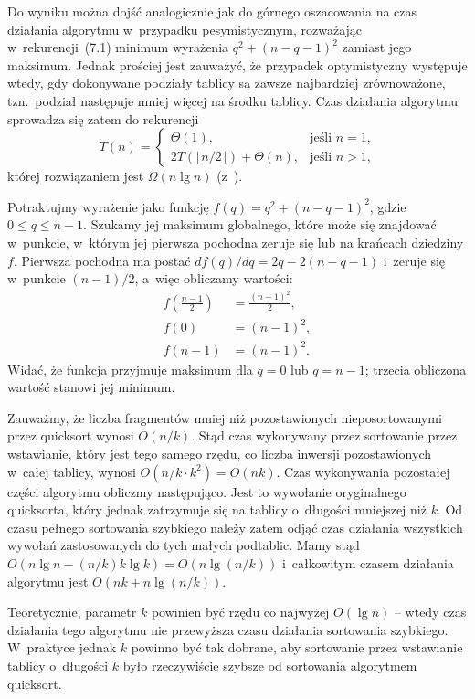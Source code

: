 Do wyniku można dojść analogicznie jak do górnego oszacowania na czas działania algorytmu w~przypadku pesymistycznym, rozważając w~rekurencji~(7.1) minimum wyrażenia $q^2+(n-q-1)^2$ zamiast jego maksimum. Jednak prościej jest zauważyć, że przypadek optymistyczny występuje wtedy, gdy dokonywane podziały tablicy są zawsze najbardziej zrównoważone, tzn.\ podział następuje mniej więcej na środku tablicy. Czas działania algorytmu sprowadza się zatem do rekurencji
\[
	T(n) = \begin{cases}
		\Theta(1), & \text{jeśli $n=1$,} \\
		2T(\lfloor n/2\rfloor)+\Theta(n), & \text{jeśli $n>1$,}
	\end{cases}
\]
której rozwiązaniem jest $\Omega(n\lg n)$ (z~).

\exercise %
Potraktujmy wyrażenie jako funkcję $f(q)=q^2+(n-q-1)^2$, gdzie $0\le q\le n-1$. Szukamy jej maksimum globalnego, które może się znajdować w~punkcie, w~którym jej pierwsza pochodna zeruje się lub na krańcach dziedziny $f$. Pierwsza pochodna ma postać $df(q)/dq=2q-2(n-q-1)$ i~zeruje się w~punkcie $(n-1)/2$, a~więc obliczamy wartości:
\begin{align*}
	f\left(\frac{n-1}{2}\right) &= \frac{(n-1)^2}{2}, \\
	f(0) &= (n-1)^2, \\
	f(n-1) &= (n-1)^2.
\end{align*}
Widać, że funkcja przyjmuje maksimum dla $q=0$ lub $q=n-1$; trzecia obliczona wartość stanowi jej minimum.

\exercise %
\exercise %
Zauważmy, że liczba fragmentów mniej niż  pozostawionych nieposortowanymi przez quicksort wynosi $O(n/k)$. Stąd czas wykonywany przez sortowanie przez wstawianie, który jest tego samego rzędu, co liczba inwersji pozostawionych w~całej tablicy, wynosi $O(n/k\cdot k^2)=O(nk)$. Czas wykonywania pozostałej części algorytmu obliczmy następująco. Jest to wywołanie oryginalnego quicksorta, który jednak zatrzymuje się na tablicy o~długości mniejszej niż $k$. Od czasu pełnego sortowania szybkiego należy zatem odjąć czas działania wszystkich wywołań zastosowanych do tych małych podtablic. Mamy stąd $O(n\lg n-(n/k)k\lg k)=O(n\lg(n/k))$ i~całkowitym czasem działania algorytmu jest $O(nk+n\lg(n/k))$.

Teoretycznie, parametr $k$ powinien być rzędu co najwyżej $O(\lg n)$ -- wtedy czas działania tego algorytmu nie przewyższa czasu działania sortowania szybkiego. W~praktyce jednak $k$ powinno być tak dobrane, aby sortowanie przez wstawianie tablicy o~długości $k$ było rzeczywiście szybsze od sortowania algorytmem quicksort.

